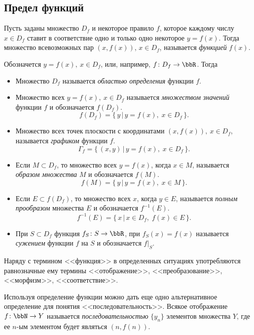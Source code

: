 \subsection{Предел функций}
\begin{defn}
Пусть заданы множество $D_f$ и некоторое правило $f$, которое каждому числу $x\in D_f$ ставит в соответствие одно и только одно некоторое $y=f(x)$. Тогда множество всевозможных пар $(x, f(x))$, $x\in D_f$, называется \textit{функцией} $f(x)$.
\end{defn}

\begin{defnn}
\end{defnn}
Обозначется $y=f(x),\ x\in D_f$, или, например, $f\colon D_f \to \bbR$. Тогда
\begin{itemize}[wide, labelwidth=!, labelindent=0pt]
\item
Множество $D_f$ называется \textit{областью определения} функции $f$.
\item
Множество всех $y=f(x),\ x\in D_f$ называется \textit{множеством значений} функции $f$ и обозначается $f(D_f)$. $$f(D_f)=\{\,y \,\big|\, y=f(x),\; x\in D_f\,\}.$$
\item 
Множество всех точек плоскости с координатами $(x, f(x)),\ x\in D_f$, называется \textit{графиком} функции $f$. $$\Gamma_f = \{\,(x,y) \,\big|\, y = f(x),\; x\in D_f\,\}.$$
\item
Если $M \subset D_f$, то множество всех $y=f(x)$, когда $x\in M$, называется \textit{образом множества} $M$ и обозначается $f(M)$. $$f(M) = \{\,y\,\big|\, y=f(x),\; x\in M\,\}.$$
\item
Если $E \subset f(D_f)$, то множество всех $x$, когда $y\in E$, называется \textit{полным прообразом} множества $E$ и обозначается $f^{-1}(E)$. $$f^{-1}(E)=\{\,x \,\big|\, x\in D_f,\; f(x)\in E\,\}.$$
\item
При $S\subset D_f$ функция $f_S\colon S\to\bbR$, при $f_S(x)=f(x)$ называется \textit{сужением} функции $f$ на $S$ и обозначается $f\bigr|_S$.
\end{itemize}
 
Наряду с термином <<функция>> в определенных ситуациях употребляются равнозначные ему термины <<отображение>>, <<преобразование>>, <<морфизм>>, <<соответствие>>.
\begin{notion}
Используя определение функции можно дать еще одно альтернативное определение для понятия <<последовательность>>. Всякое отображение $f\colon \bbN \to Y$  называется \textit{последовательностью} $\{y_n\}$ элементов множества $Y$, где ее $n$-ым элементом будет являться $(n,f(n))$.
\end{notion} 

